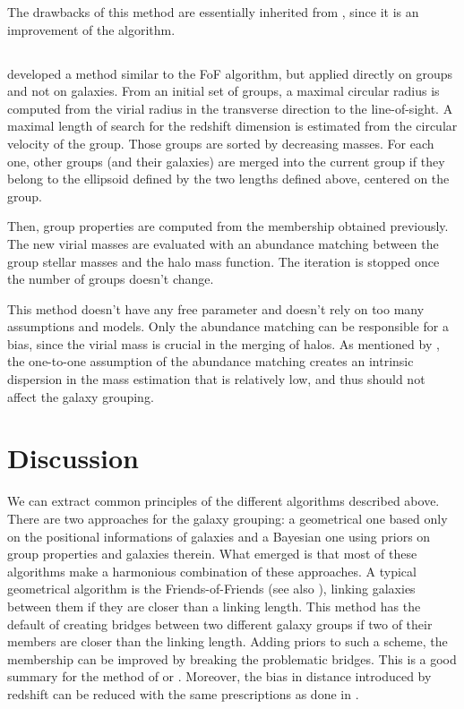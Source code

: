The drawbacks of this method are essentially inherited from \citet{Yang+07},
since it is an improvement of the \citeauthor{Yang+07} algorithm.

\subsection{\citet{MunozCuartas+12}}
\label{sub:munozcuartas12}

\cite{MunozCuartas+12} developed a method similar to the FoF algorithm, but
applied directly on groups and not on galaxies. From an initial set of groups,
a maximal circular radius is computed from the virial radius in the transverse
direction to the line-of-sight. A maximal length of search for the redshift
dimension is estimated from the circular velocity of the group. Those groups
are sorted by decreasing masses. For each one, other groups (and their
galaxies) are merged into the current group if they belong to the ellipsoid
defined by the two lengths defined above, centered on the group.

Then, group properties are computed from the membership obtained previously.
The new virial masses are evaluated with an abundance matching between the
group stellar masses and the halo mass function. The iteration is stopped once
the number of groups doesn't change.

This method doesn't have any free parameter and doesn't rely on too many
assumptions and models. Only the abundance matching can be responsible for a
bias, since the virial mass is crucial in the merging of halos. As mentioned by
\citet{Yang+07}, the one-to-one assumption of the abundance matching creates an
intrinsic dispersion in the mass estimation that is relatively low, and thus
should not affect the galaxy grouping.

\section{Discussion}
\label{sec:gga_discussion}

We can extract common principles of the different algorithms described above.
There are two approaches for the galaxy grouping: a geometrical one based only
on the positional informations of galaxies and a Bayesian one using priors on
group properties and galaxies therein. What emerged is that most of these
algorithms make a harmonious combination of these approaches. A typical
geometrical algorithm is the Friends-of-Friends (see also
), linking galaxies between them
if they are closer than a linking length. This method has the default of
creating bridges between two different galaxy groups if two of their members
are closer than the linking length. Adding priors to such a scheme, the
membership can be improved by breaking the problematic bridges. This is a good
summary for the method of \citet{Marinoni+02} or \citet{MunozCuartas+12}.
Moreover, the bias in distance introduced by redshift can be reduced with the
same prescriptions as done in \citet{Liu+08}.

